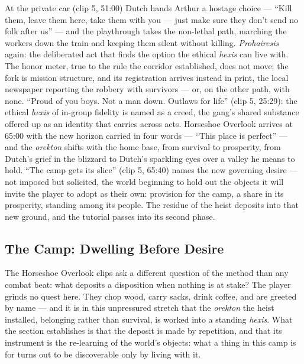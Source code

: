 At the private car (clip 5, 51:00) Dutch hands Arthur a hostage choice — ``Kill them, leave them here, take them with you — just make sure they don't send no folk after us'' — and the playthrough takes the non-lethal path, marching the workers down the train and keeping them silent without killing. \textit{Prohairesis} again: the deliberated act that finds the option the ethical \textit{hexis} can live with. The honor meter, true to the rule the corridor established, does not move; the fork is mission structure, and its registration arrives instead in print, the local newspaper reporting the robbery with survivors — or, on the other path, with none. ``Proud of you boys. Not a man down. Outlaws for life'' (clip 5, 25:29): the ethical \textit{hexis} of in-group fidelity is named as a creed, the gang's shared substance offered up as an identity that carries across acts. Horseshoe Overlook arrives at 65:00 with the new horizon carried in four words — ``This place is perfect'' — and the \textit{orekton} shifts with the home base, from survival to prosperity, from Dutch's grief in the blizzard to Dutch's sparkling eyes over a valley he means to hold. ``The camp gets its slice'' (clip 5, 65:40) names the new governing desire — not imposed but solicited, the world beginning to hold out the objects it will invite the player to adopt as their own: provision for the camp, a share in its prosperity, standing among its people. The residue of the heist deposits into that new ground, and the tutorial passes into its second phase.

\bigskip

\subsection*{The Camp: Dwelling Before Desire}

The Horseshoe Overlook clips ask a different question of the method than any combat beat: what deposits a disposition when nothing is at stake? The player grinds no quest here. They chop wood, carry sacks, drink coffee, and are greeted by name — and it is in this unpressured stretch that the \textit{orekton} the heist installed, belonging rather than survival, is worked into a standing \textit{hexis}. What the section establishes is that the deposit is made by repetition, and that its instrument is the re-learning of the world's objects: what a thing in this camp is for turns out to be discoverable only by living with it.

